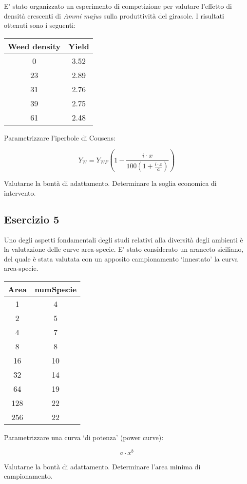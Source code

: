 \documentclass[a4paper,12pt,oneside]{book}
\begin{document}
E' stato organizzato un esperimento di competizione per valutare l'effetto di densità crescenti di \emph{Ammi majus} sulla produttività del girasole. I risultati ottenuti sono i seguenti:

\begin{longtable}[]{@{}cc@{}}
\toprule
Weed density & Yield \\
\midrule
\endhead
0 & 3.52 \\
23 & 2.89 \\
31 & 2.76 \\
39 & 2.75 \\
61 & 2.48 \\
\bottomrule
\end{longtable}

Parametrizzare l'iperbole di Cousens:

\[Y_W  = Y_{WF} \left( 1 - \frac{i \cdot x}{100\left( 1 + \frac{i \cdot x}{a} \right)} \right)\]

Valutarne la bontà di adattamento. Determinare la soglia economica di intervento.

\hypertarget{esercizio-5-4}{%
\subsection{Esercizio 5}\label{esercizio-5-4}}

Uno degli aspetti fondamentali degli studi relativi alla diversità degli ambienti è la valutazione delle curve area-specie. E' stato considerato un aranceto siciliano, del quale è stata valutata con un apposito campionamento `innestato' la curva area-specie.

\begin{longtable}[]{@{}cc@{}}
\toprule
Area & numSpecie \\
\midrule
\endhead
1 & 4 \\
2 & 5 \\
4 & 7 \\
8 & 8 \\
16 & 10 \\
32 & 14 \\
64 & 19 \\
128 & 22 \\
256 & 22 \\
\bottomrule
\end{longtable}

Parametrizzare una curva `di potenza' (power curve):

\[a \cdot x^b\]

Valutarne la bontà di adattamento. Determinare l'area minima di campionamento.
\end{document}
